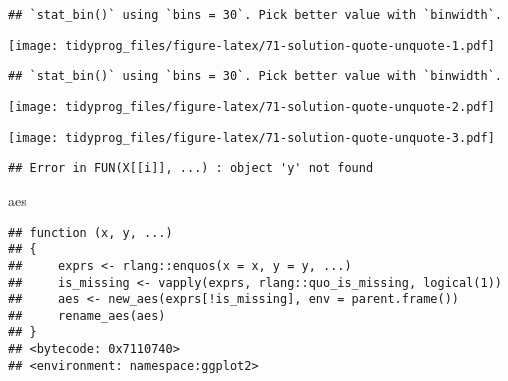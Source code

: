 \documentclass[]{book}
\newenvironment{Shaded}{\begin{snugshade}}{\end{snugshade}}
\newcommand{\KeywordTok}[1]{\textcolor[rgb]{0.13,0.29,0.53}{\textbf{#1}}}
\newcommand{\NormalTok}[1]{#1}
\newcommand{\OperatorTok}[1]{\textcolor[rgb]{0.81,0.36,0.00}{\textbf{#1}}}
\newcommand{\StringTok}[1]{\textcolor[rgb]{0.31,0.60,0.02}{#1}}
\begin{document}
\begin{verbatim}
## `stat_bin()` using `bins = 30`. Pick better value with `binwidth`.
\end{verbatim}

\texttt{[image: tidyprog\_files/figure-latex/71-solution-quote-unquote-1.pdf]}

\begin{Shaded}
\end{Shaded}

\begin{verbatim}
## `stat_bin()` using `bins = 30`. Pick better value with `binwidth`.
\end{verbatim}

\texttt{[image: tidyprog\_files/figure-latex/71-solution-quote-unquote-2.pdf]}

\begin{Shaded}
\end{Shaded}

\texttt{[image: tidyprog\_files/figure-latex/71-solution-quote-unquote-3.pdf]}

\begin{verbatim}
## Error in FUN(X[[i]], ...) : object 'y' not found
\end{verbatim}

\begin{Shaded}
\begin{Highlighting}[]
\NormalTok{aes}
\end{Highlighting}
\end{Shaded}

\begin{verbatim}
## function (x, y, ...) 
## {
##     exprs <- rlang::enquos(x = x, y = y, ...)
##     is_missing <- vapply(exprs, rlang::quo_is_missing, logical(1))
##     aes <- new_aes(exprs[!is_missing], env = parent.frame())
##     rename_aes(aes)
## }
## <bytecode: 0x7110740>
## <environment: namespace:ggplot2>
\end{verbatim}
\end{document}
